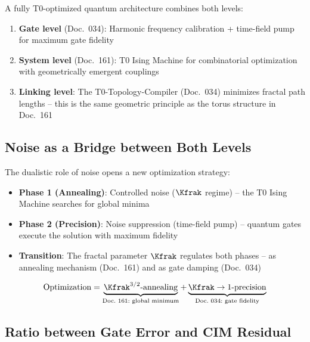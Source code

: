 \begin{keyresult}
    A fully T0-optimized quantum architecture combines both levels:
    \begin{enumerate}
        \item \textbf{Gate level} (Doc.\ 034): Harmonic frequency calibration +
        time-field pump for maximum gate fidelity
        \item \textbf{System level} (Doc.\ 161): T0 Ising Machine for combinatorial
        optimization with geometrically emergent couplings
        \item \textbf{Linking level}: The T0-Topology-Compiler (Doc.\ 034) minimizes
        fractal path lengths -- this is the same geometric principle as the torus
        structure in Doc.\ 161
    \end{enumerate}
\end{keyresult}

\subsection{Noise as a Bridge between Both Levels}

The dualistic role of noise opens a new optimization strategy:

\begin{itemize}
    \item \textbf{Phase 1 (Annealing)}: Controlled noise ($\Kfrak$ regime)
    -- the T0 Ising Machine searches for global minima
    \item \textbf{Phase 2 (Precision)}: Noise suppression (time-field pump)
    -- quantum gates execute the solution with maximum fidelity
    \item \textbf{Transition}: The fractal parameter $\Kfrak$ regulates both phases --
    as annealing mechanism (Doc.\ 161) and as gate damping (Doc.\ 034)
\end{itemize}

\begin{equation}
    \text{Optimization} = \underbrace{\Kfrak^{3/2}\text{-annealing}}_{\text{Doc.\ 161:\ global minimum}}
    + \underbrace{\Kfrak \rightarrow 1\text{-precision}}_{\text{Doc.\ 034:\ gate fidelity}}
    \label{eq:hybrid_optimization}
\end{equation}

\subsection{Ratio between Gate Error and CIM Residual}

